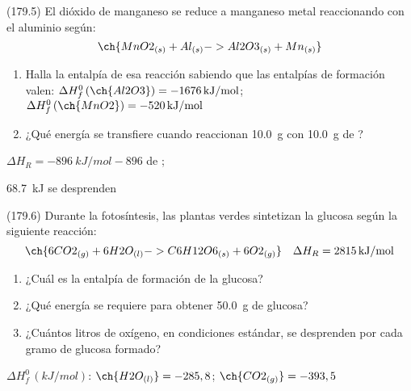   \begin{exercise}[
      tags    = {},
      topics  = {química, termodinámica, termoquímica},
      source  = {FQ 1B MGH 2016, p179, e5},
    ]
    (179.5) El dióxido de manganeso se reduce a manganeso metal reaccionando con el aluminio según:
    \[ \ch{MnO2_{(s)} + Al_{(s)} -> Al2O3_{(s)} + Mn_{(s)}} \]

    \begin{enumerate}
      \item Halla la entalpía de esa reacción sabiendo que las entalpías
      de formación valen:
      \( \Delta H^0_f\,(\ch{Al2O3}) = \SI{-1676}{kJ/mol} \); \( \Delta H^0_f\,(\ch{MnO2}) = \SI{-520}{kJ/mol} \)
      \item ¿Qué energía se transfiere cuando reaccionan \SI{10.0}{\gram}
       con \SI{10.0}{\gram} de ?
    \end{enumerate}
  \end{exercise}

  \begin{solution}
    \begin{enumerate*}
      \item \( \Delta H_R = \SI{-896}{kJ/mol}-896 \) de ;
      \item \SI{68.7}{kJ} se desprenden
    \end{enumerate*}
  \end{solution}




  \begin{exercise}[
      tags    = {},
      topics  = {química, termodinámica, termoquímica},
      source  = {FQ 1B MGH 2016, p179, e6},
    ]
    (179.6) Durante la fotosíntesis, las plantas verdes sintetizan la glucosa según la siguiente reacción:
    \[ \ch{6 CO2_{(g)} + 6 H2O_{(l)} -> C6H12O6_{(s)} + 6 O2_{(g)}} \quad \Delta H_R = \SI{2815}{kJ/mol} \]
    \begin{enumerate}
      \item ¿Cuál es la entalpía de formación de la glucosa?
      \item ¿Qué energía se requiere para obtener \SI{50.0}{\gram} de glucosa?
      \item ¿Cuántos litros de oxígeno, en condiciones estándar, se desprenden por cada gramo de glucosa formado?
    \end{enumerate}

    \begin{gexdatos}
      \( \Delta H^0_f\,(\si{kJ/mol}) \): \( \ch{H2O_{(l)}} = -285,8 \); \( \ch    {CO2_{(g)}} = -393,5 \)
    \end{gexdatos}
  \end{exercise}

